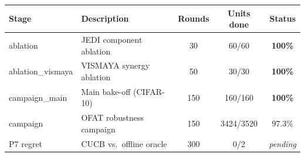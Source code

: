 \begin{tabular}{@{}l l c c c@{}}
\toprule
Stage & Description & Rounds & Units done & Status \\
\midrule
ablation & JEDI component ablation & 30 & 60/60 & \textbf{100\%} \\
ablation\_vismaya & VISMAYA synergy ablation & 50 & 30/30 & \textbf{100\%} \\
campaign\_main & Main bake-off (CIFAR-10) & 150 & 160/160 & \textbf{100\%} \\
campaign & OFAT robustness campaign & 150 & 3424/3520 & 97.3\% \\
\midrule
P7 regret & CUCB vs.\ offline oracle & 300 & 0/2 & \textit{pending} \\
\bottomrule
\end{tabular}